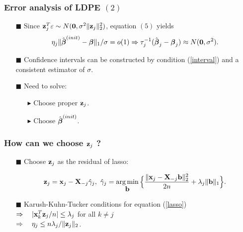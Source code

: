 \begin{frame}
\frametitle{Error analysis of LDPE $(2)$}
\begin{itemize}

\item[$\blacksquare$] Since $\mbox{\bf z}_{j} ^T \varepsilon \sim N(\mbox{\bf 0}, \sigma^{2} \|\mbox{\bf z}_{j}\|^{2}_{2})$, equation $(5)$ yields
\begin{equation}
\label{interval}
\eta_{j}\|\hat{\mbox{\boldmath $\beta$}}^{(init)}-\mbox{\boldmath $\beta$}\|_{1}/\sigma=o(1)\Rightarrow \tau^{-1}_{j}(\hat{\mbox{\boldmath $\beta$}}_{j}-\mbox{\boldmath $\beta$}_{j})\approx N(\mbox{\bf 0},\sigma^{2}).
\end{equation}
\item[$\blacksquare$] Confidence intervals can be constructed by condition (\ref{interval}) and a consistent estimator of $\sigma$.
\item[$\blacksquare$] Need to solve:
  \begin{itemize}
  \item[$\blacktriangleright$] Choose proper $\mbox{\bf z}_{j}$.
  \item[$\blacktriangleright$] Choose $\hat{\mbox{\boldmath $\beta$}}^{(init)}$.
  \end{itemize}

\end{itemize}
\end{frame}

\begin{frame}
\frametitle{How can we choose $\mbox{\bf z}_{j}$ ?}
\begin{itemize}

\item[$\blacksquare$] Choose $\mbox{\bf z}_{j}$ as the residual of lasso:
\begin{small}
\begin{equation}
\label{lasso}
\mbox{\bf z}_j = \mbox{\bf x}_j - \mbox{\bf X}_{-j} \hat{\gamma}_j,\
\hat{\gamma}_j = \mathop{\arg\min}_{\mbox{\bf b}}\Big\{\frac{\|\mbox{\bf x}_j-\mbox{\bf X}_{-j}\mbox{\bf b}\|_2^2}{2n}+\lambda_j \|\mbox{\bf b}\|_1\Big\}.
\end{equation}
\end{small}
\item[$\blacksquare$] Karush-Kuhn-Tucker conditions for equation (\ref{lasso})  \\
                      $\Rightarrow \quad |\mbox{\bf x}_k^T\mbox{\bf z}_j/n|\le\lambda_{j}$ for all $k \neq j$ \\
                      \medskip
                      $\Rightarrow \quad \eta_j\le n\lambda_j/\|\mbox{\bf z}_j\|_2$.

\end{itemize}


\end{frame}


